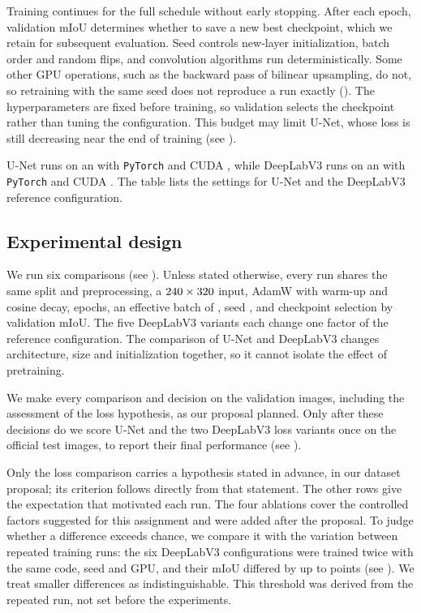 Training continues for the full schedule without early stopping. After each
epoch, validation mIoU determines whether to save a new best checkpoint, which
we retain for subsequent evaluation. Seed \unetSeed{} controls new-layer
initialization, batch order and random flips, and convolution algorithms run
deterministically. Some other GPU operations, such as the backward pass of
bilinear upsampling, do not, so retraining with the same seed does not
reproduce a run exactly (). The hyperparameters are fixed before training, so validation
selects the checkpoint rather than tuning the configuration. This budget may
limit U-Net, whose loss is still decreasing near the end of training
(see ).

U-Net runs on an \unetDevice{} with \texttt{PyTorch} \unetTorchVersion{}
and CUDA \unetCudaVersion{}, while DeepLabV3 runs on an \deeplabDevice{}
with \texttt{PyTorch} \deeplabTorchVersion{} and CUDA \deeplabCudaVersion{}. The
table lists the settings for U-Net and the DeepLabV3 reference configuration.



\subsection{Experimental design}
\label{sec:experiments}
We run six comparisons (see ). Unless stated
otherwise, every run shares the same split and preprocessing, a
$240\times320$ input, AdamW with warm-up and cosine
decay, \unetEpochs{} epochs, an effective batch of \suimEffectiveBatch{},
seed \unetSeed{}, and checkpoint selection by validation mIoU. The five
DeepLabV3 variants each change one factor of the reference configuration. The
comparison of U-Net and DeepLabV3 changes architecture, size and initialization
together, so it cannot isolate the effect of pretraining.

We make every comparison and decision on the \suimValImages{} validation
images, including the assessment of the loss hypothesis, as our proposal
planned. Only after these decisions do we score U-Net and the two DeepLabV3
loss variants once on the \suimTestUsable{} official test images, to report
their final performance (see ).



Only the loss comparison carries a hypothesis stated in advance, in our
dataset proposal; its criterion follows directly from that statement. The
other rows give the expectation that motivated each run. The four ablations
cover the controlled factors suggested for this assignment and were added
after the proposal. To judge whether a difference exceeds chance, we compare it
with the variation between repeated training runs: the six DeepLabV3
configurations were trained twice with the same code, seed and GPU, and their
mIoU differed by up to \repeatMaxMiouGap{} points (see ).
We treat smaller differences as indistinguishable. This threshold was derived
from the repeated run, not set before the experiments.
